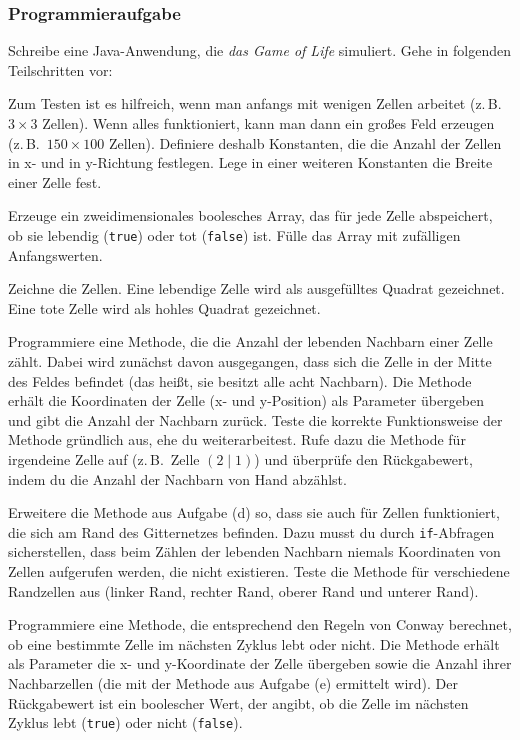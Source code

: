 \subsubsection{Programmieraufgabe}

Schreibe eine Java-Anwendung, die \emph{das Game of Life} simuliert. Gehe in
folgenden Teilschritten vor:

\begin{compactenum}[a)]
\item Zum Testen ist es hilfreich, wenn man anfangs mit wenigen Zellen
arbeitet (z.\,B.\ $3 \times 3$ Zellen). Wenn alles funktioniert, kann man dann ein großes
Feld erzeugen (z.\,B.\ $150 \times 100$ Zellen). Definiere deshalb Konstanten, die die
Anzahl der Zellen in x- und in y-Richtung festlegen. Lege in einer weiteren
Konstanten die Breite einer Zelle fest.

\item Erzeuge ein zweidimensionales boolesches Array, das für jede Zelle
abspeichert, ob sie lebendig (\lstinline|true|) oder tot (\lstinline|false|) ist.
Fülle das Array mit zufälligen Anfangswerten.

\item Zeichne die Zellen. Eine lebendige Zelle wird als ausgefülltes Quadrat
gezeichnet. Eine tote Zelle wird als hohles Quadrat gezeichnet.

\item Programmiere eine Methode, die die Anzahl der lebenden Nachbarn einer
Zelle zählt. Dabei wird zunächst davon ausgegangen, dass sich die Zelle in der
Mitte des Feldes befindet (das heißt, sie besitzt alle acht Nachbarn). Die
Methode erhält die Koordinaten der Zelle (x- und y-Position) als Parameter
übergeben und gibt die Anzahl der Nachbarn zurück. Teste die korrekte
Funktionsweise der Methode gründlich aus, ehe du weiterarbeitest. Rufe dazu
die Methode für irgendeine Zelle auf (z.\,B.\ Zelle $(2 \mid 1)$) und überprüfe den
Rückgabewert, indem du die Anzahl der Nachbarn von Hand abzählst.

\item Erweitere die Methode aus Aufgabe (d) so, dass sie auch für Zellen
funktioniert, die sich am Rand des Gitternetzes befinden. Dazu musst du durch
\lstinline|if|-Abfragen sicherstellen, dass beim Zählen der lebenden Nachbarn
niemals Koordinaten von Zellen aufgerufen werden, die nicht existieren. Teste
die Methode für verschiedene Randzellen aus (linker Rand, rechter Rand, oberer
Rand und unterer Rand).

\item Programmiere eine Methode, die entsprechend den Regeln von Conway
berechnet, ob eine bestimmte Zelle im nächsten Zyklus lebt oder nicht. Die
Methode erhält als Parameter die x- und y-Koordinate der Zelle übergeben sowie
die Anzahl ihrer Nachbarzellen (die mit der Methode aus Aufgabe (e) ermittelt
wird). Der Rückgabewert ist ein boolescher Wert, der angibt, ob die Zelle im
nächsten Zyklus lebt (\lstinline|true|) oder nicht (\lstinline|false|).


\end{compactenum}
